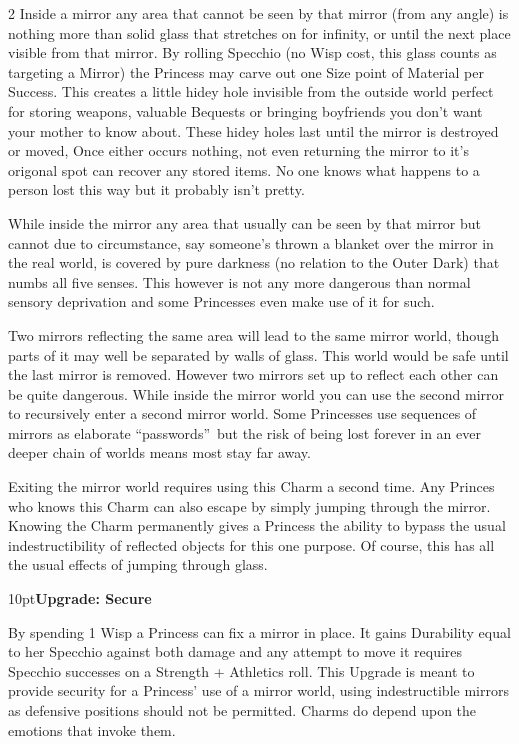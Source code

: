 \begin{multicols}{2}
Inside a mirror any area that cannot be seen by that mirror (from any angle) is nothing more than solid glass that stretches on for infinity, or until the next place visible from that mirror. By rolling Specchio (no Wisp cost, this glass counts as targeting a Mirror) the Princess may carve out one Size point of Material per Success. This creates a little hidey hole invisible from the outside world perfect for storing weapons, valuable Bequests or bringing boyfriends you don't want your mother to know about. These hidey holes last until the mirror is destroyed or moved, Once either occurs nothing, not even returning the mirror to it's origonal spot can recover any stored items. No one knows what happens to a person lost this way but it probably isn't pretty.

While inside the mirror any area that usually can be seen by that mirror but cannot due to circumstance, say someone's thrown a blanket over the mirror in the real world, is covered by pure darkness (no relation to the Outer Dark) that numbs all five senses. This however is not any more dangerous than normal sensory deprivation and some Princesses even make use of it for such.

Two mirrors reflecting the same area will lead to the same mirror world, though parts of it may well be separated by walls of glass. This world would be safe until the last mirror is removed. However two mirrors set up to reflect each other can be quite dangerous. While inside the mirror world you can use the second mirror to recursively enter a second mirror world. Some Princesses use sequences of mirrors as elaborate \textquotedblleft passwords\textquotedblright\, but the risk of being lost forever in an ever deeper chain of worlds means most stay far away.

Exiting the mirror world requires using this Charm a second time. Any Princes who knows this Charm can also escape by simply jumping through the mirror. Knowing the Charm permanently gives a Princess the ability to bypass the usual indestructibility of reflected objects for this one purpose. Of course, this has all the usual effects of jumping through glass. 

\begin{myindentpar}{10pt}\textbf{Upgrade: Secure}

By spending 1 Wisp a Princess can fix a mirror in place. It gains Durability equal to her Specchio against both damage and any attempt to move it requires Specchio successes on a Strength + Athletics roll. This Upgrade is meant to provide security for a Princess' use of a mirror world, using indestructible mirrors as defensive positions should not be permitted. Charms do depend upon the emotions that invoke them.


\end{myindentpar}
\end{multicols}
